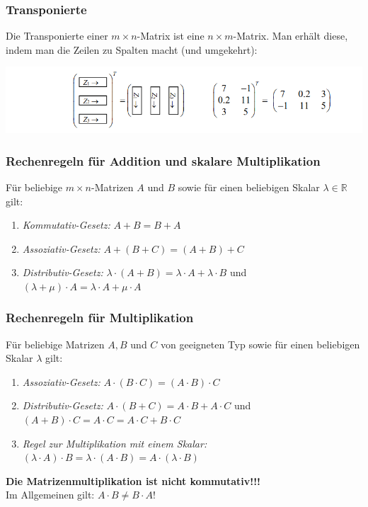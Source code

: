 \vfill

\subsubsection{Transponierte}%
\label{ssub:Transponierte}
Die Transponierte einer $m \times n$-Matrix ist eine $n \times m$-Matrix. Man erhält diese, indem man die Zeilen zu Spalten macht (und umgekehrt):
\begin{center}
  \includegraphics[width=0.8\linewidth]{images/transponierte.png}
\end{center}

\subsubsection{Rechenregeln für Addition und skalare Multiplikation}%
\label{ssub:Rechenregeln für Addition und skalare Multiplikation}
Für beliebige $m \times n$-Matrizen $A$ und $B$ sowie für einen beliebigen Skalar $\lambda \in \mathbb{R}$ gilt:
\begin{enumerate}
  \item \textit{Kommutativ-Gesetz: } $A+B=B+A$
  \item \textit{Assoziativ-Gesetz: } $A+(B+C)=(A+B)+C$
  \item \textit{Distributiv-Gesetz: } $\lambda \cdot (A+B) = \lambda \cdot A + \lambda \cdot B$ und $(\lambda + \mu) \cdot A = \lambda \cdot A + \mu \cdot A$
\end{enumerate}

\subsubsection{Rechenregeln für Multiplikation}%
\label{ssub:Rechenregeln für Multiplikation}
Für beliebige Matrizen $A,B$ und $C$ von geeigneten Typ sowie für einen beliebigen Skalar $\lambda$ gilt:
\begin{enumerate}
  \item \textit{Assoziativ-Gesetz: } $A \cdot (B \cdot C)=(A \cdot B) \cdot C$
  \item \textit{Distributiv-Gesetz: } $A \cdot (B+C) = A \cdot B + A \cdot C$ und $(A+B) \cdot C = A \cdot C = A \cdot C + B \cdot C$
  \item \textit{Regel zur Multiplikation mit einem Skalar: } $(\lambda \cdot A) \cdot B = \lambda \cdot (A \cdot B) = A \cdot (\lambda \cdot B)$
\end{enumerate}
\textbf{Die Matrizenmultiplikation ist nicht kommutativ!!!} \\
Im Allgemeinen gilt: $A \cdot B \neq B \cdot A$!

